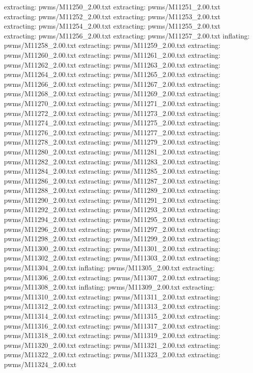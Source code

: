\documentclass[letterpaper,10pt,english]{sphinxmanual}
\begin{document}
{\begin{sphinxVerbatim}[commandchars=\\\{\}]
 extracting: pwms/M11250\_2.00.txt
 extracting: pwms/M11251\_2.00.txt
 extracting: pwms/M11252\_2.00.txt
 extracting: pwms/M11253\_2.00.txt
 extracting: pwms/M11254\_2.00.txt
 extracting: pwms/M11255\_2.00.txt
 extracting: pwms/M11256\_2.00.txt
 extracting: pwms/M11257\_2.00.txt
  inflating: pwms/M11258\_2.00.txt
 extracting: pwms/M11259\_2.00.txt
 extracting: pwms/M11260\_2.00.txt
 extracting: pwms/M11261\_2.00.txt
 extracting: pwms/M11262\_2.00.txt
 extracting: pwms/M11263\_2.00.txt
 extracting: pwms/M11264\_2.00.txt
 extracting: pwms/M11265\_2.00.txt
 extracting: pwms/M11266\_2.00.txt
 extracting: pwms/M11267\_2.00.txt
 extracting: pwms/M11268\_2.00.txt
 extracting: pwms/M11269\_2.00.txt
 extracting: pwms/M11270\_2.00.txt
 extracting: pwms/M11271\_2.00.txt
 extracting: pwms/M11272\_2.00.txt
 extracting: pwms/M11273\_2.00.txt
 extracting: pwms/M11274\_2.00.txt
 extracting: pwms/M11275\_2.00.txt
 extracting: pwms/M11276\_2.00.txt
 extracting: pwms/M11277\_2.00.txt
 extracting: pwms/M11278\_2.00.txt
 extracting: pwms/M11279\_2.00.txt
 extracting: pwms/M11280\_2.00.txt
 extracting: pwms/M11281\_2.00.txt
 extracting: pwms/M11282\_2.00.txt
 extracting: pwms/M11283\_2.00.txt
 extracting: pwms/M11284\_2.00.txt
 extracting: pwms/M11285\_2.00.txt
 extracting: pwms/M11286\_2.00.txt
 extracting: pwms/M11287\_2.00.txt
 extracting: pwms/M11288\_2.00.txt
 extracting: pwms/M11289\_2.00.txt
 extracting: pwms/M11290\_2.00.txt
 extracting: pwms/M11291\_2.00.txt
 extracting: pwms/M11292\_2.00.txt
 extracting: pwms/M11293\_2.00.txt
 extracting: pwms/M11294\_2.00.txt
 extracting: pwms/M11295\_2.00.txt
 extracting: pwms/M11296\_2.00.txt
 extracting: pwms/M11297\_2.00.txt
 extracting: pwms/M11298\_2.00.txt
 extracting: pwms/M11299\_2.00.txt
 extracting: pwms/M11300\_2.00.txt
 extracting: pwms/M11301\_2.00.txt
 extracting: pwms/M11302\_2.00.txt
 extracting: pwms/M11303\_2.00.txt
 extracting: pwms/M11304\_2.00.txt
  inflating: pwms/M11305\_2.00.txt
 extracting: pwms/M11306\_2.00.txt
 extracting: pwms/M11307\_2.00.txt
 extracting: pwms/M11308\_2.00.txt
  inflating: pwms/M11309\_2.00.txt
 extracting: pwms/M11310\_2.00.txt
 extracting: pwms/M11311\_2.00.txt
 extracting: pwms/M11312\_2.00.txt
 extracting: pwms/M11313\_2.00.txt
 extracting: pwms/M11314\_2.00.txt
 extracting: pwms/M11315\_2.00.txt
 extracting: pwms/M11316\_2.00.txt
 extracting: pwms/M11317\_2.00.txt
 extracting: pwms/M11318\_2.00.txt
 extracting: pwms/M11319\_2.00.txt
 extracting: pwms/M11320\_2.00.txt
 extracting: pwms/M11321\_2.00.txt
 extracting: pwms/M11322\_2.00.txt
 extracting: pwms/M11323\_2.00.txt
 extracting: pwms/M11324\_2.00.txt

\end{sphinxVerbatim}}
\end{document}
